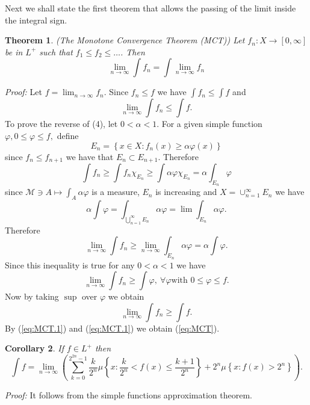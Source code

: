 \documentclass[12pt]{report}
\newtheorem{theorem}{Theorem}[section]
\newtheorem{corollary}[theorem]{Corollary}
\begin{document}
Next we shall state the first theorem that allows the
passing of the limit inside the integral sign.

\begin{theorem} (The Monotone Convergence Theorem (MCT))  Let $f_n: X
\longrightarrow [0, \infty]$ be in $L^+$ such that $f_1 \le f_2 \le\dots$. 
Then
\begin{equation}\label{eq:MCT}
\lim_{n \to \infty} \int f_n = \int \lim_{n \to \infty} f_n 
\end{equation}
\end{theorem}
\textit{Proof:} 
 Let $f = \lim_{n \to \infty} f_n$.  Since $f_n \le f$ we have
$\int f_n\le \int f$ and 
\begin{equation}\label{eq:MCT.1}
\lim_{n \to \infty} \int f_n \le \int f.
\end{equation} 
To prove the reverse of (4), let $0 < \alpha < 1$.  For a
given simple function
$\varphi, 0 \le \varphi \le f,$ define
\[ E_n = \left \{x \in X: f_n (x) \ge \alpha \varphi(x) \right \}
\] since $f_n \le f_{n+1}$ we have that $E_n \subset E_{n+1}$.  Therefore
\[
\int f_n \ge \int f_n \chi_{E_n} \ge \int \alpha \varphi \chi_{E_n} =
\alpha \int_{E_n}\varphi 
\] 
since $\mathcal{M} \ni A \longmapsto \int_A \alpha \varphi$ is a
measure, $E_n$ is increasing and $X =
{\cup}^\infty_{n=1} E_n$ we have 
\[
\alpha \int \varphi = \int_{\bigcup^\infty_{n=1} E_n} \alpha \varphi =
\lim
\int_{E_n} \alpha \varphi.
\] Therefore
\[
\lim_{n \to \infty} \int f_n \ge \lim_{n \to \infty} \int_{E_n} \alpha
\varphi = \alpha
\int \varphi.
\] Since this inequality is true for any $0 < \alpha < 1$ we have
\[
\lim_{n \to \infty} \int f_n \ge \int \varphi, \ \forall \varphi \mbox{
with } 0 \le
\varphi \le f.
\] Now by taking $\sup$ over $\varphi$ we obtain
\begin{equation}\label{eq:MCT.2}
\lim_{n \to \infty} \int f_n \ge \int f.
\end{equation} 
By (\ref{eq:MCT.1}) and (\ref{eq:MCT.1}) we obtain (\ref{eq:MCT}).


\begin{corollary} 
 If $f \in L^+$ then
\[
\int f = \lim\limits_{n \to \infty} \left ( \sum\limits^{2^{2n} -1}_{k = 0}
\frac{k}{2^n} \mu
\left \{ x: \frac{k}{2^n} < f(x) \le \frac{k+1}{2^n} \right \}  +2^n \mu \left
\{x: f(x) > 2^n\right \}  \right ).
\]
\end{corollary}
\textit{Proof:}  It follows from the simple functions approximation
theorem.
\end{document}
